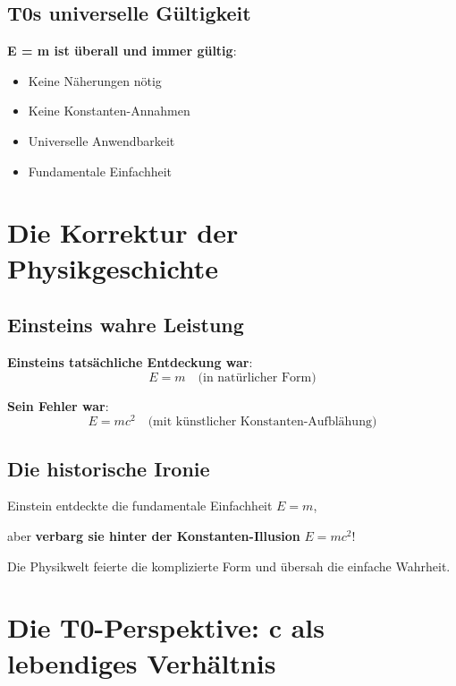 \documentclass[12pt,a4paper]{article}
\begin{document}
	\subsection{T0s universelle Gültigkeit}
	
	\textbf{E = m ist überall und immer gültig}:
	\begin{itemize}
		\item Keine Näherungen nötig
		\item Keine Konstanten-Annahmen
		\item Universelle Anwendbarkeit
		\item Fundamentale Einfachheit
	\end{itemize}
	
	\section{Die Korrektur der Physikgeschichte}
	
	\subsection{Einsteins wahre Leistung}
	
	\textbf{Einsteins tatsächliche Entdeckung war}:
	\begin{equation}
		E = m \quad \text{(in natürlicher Form)}
	\end{equation}
	
	\textbf{Sein Fehler war}:
	\begin{equation}
		E = mc^2 \quad \text{(mit künstlicher Konstanten-Aufblähung)}
	\end{equation}
	
	\subsection{Die historische Ironie}
	
	\begin{tcolorbox}[colback=blue!5!white,colframe=blue!75!black,title=Die große Ironie]
		Einstein entdeckte die fundamentale Einfachheit $E = m$, 
		
		aber \textbf{verbarg sie hinter der Konstanten-Illusion} $E = mc^2$!
		
		Die Physikwelt feierte die komplizierte Form und übersah die einfache Wahrheit.
	\end{tcolorbox}
	
	\section{Die T0-Perspektive: c als lebendiges Verhältnis}
	
\end{document}
